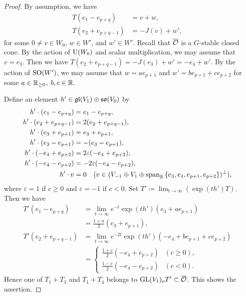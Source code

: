 \begin{proof}
	By assumption, we have
	\begin{align*}
		T(e_1 - e_{p+q}) &= v + w, \\
		T(e_2 + e_{p+q-1}) &= -J(v) + w',
	\end{align*}
	for some $0\neq v \in W_0$, $w \in W'$, and $w' \in W'$.
	Recall that $\overline{\mathcal{O}}$ is a $G$-stable closed cone.
	By the action of $\mathrm{U}(W_0)$ and scalar multiplication, we may assume that $v = e_3$.
	Then we have $T(e_2 + e_{p+q-1}) = -J(e_3) + w' = -e_4 + w'$.
	By the action of $\mathrm{SO}(W')$, we may assume that $w = ae_{p+1}$ and $w' = be_{p+1} + ce_{p+2}$ for some $a \in \mathbb{R}_{\geq 0}$, $b, c \in \mathbb{R}$.
	
	Define an element $h' \in \mathfrak{gl}(V_1) \oplus \mathfrak{so}(V_0)$ by
	\begin{align*}
		h' \cdot (e_1 - e_{p+q}) &= e_1 - e_{p+q}, \\
		h'\cdot (e_2 + e_{p+q-1}) &= 2(e_2 + e_{p+q-1}), \\
		h'\cdot (e_3 + e_{p+1}) &= e_3 + e_{p+1}, \\
		h'\cdot (e_3 - e_{p+1}) &= -(e_3 - e_{p+1}), \\
		h'\cdot (-e_4 + e_{p+2}) &= 2\varepsilon (-e_4 + e_{p+2}), \\
		h'\cdot (-e_4 - e_{p+2}) &= -2\varepsilon(-e_4 - e_{p+2}), \\
		h'\cdot v &= 0 \quad (v \in (V_{-1} \oplus V_1 \oplus \mathrm{span}_{\mathbb{R}}\left\{e_3, e_4, e_{p+1}, e_{p+2}\right\})^\perp),
	\end{align*}
	where $\varepsilon = 1$ if $c \geq 0$ and $\varepsilon = -1$ if $c < 0$.
	Set $T'\coloneq \lim_{t\to \infty} (\exp(th')T)$.
	Then we have
	\begin{align*}
		T'(e_1 - e_{p+q}) &= \lim_{t\to \infty} e^{-t}\exp(th')(e_3 + ae_{p+1})\\ 
		&= \frac{1+a}{2}(e_3 + e_{p+1}), \\
		T'(e_2 + e_{p+q-1}) &= \lim_{t\to \infty} e^{-2t}\exp(th')(-e_4 + be_{p+1} + ce_{p+2}) \\
		&= \begin{cases}
			\frac{1+c}{2}(-e_4 + e_{p+2}) & (c \geq 0), \\
			\frac{1-c}{2}(-e_4 - e_{p+2}) & (c < 0).
		\end{cases}
	\end{align*}
	Hence one of $T_1 + T_3$ and $T_1 + T_4$ belongs to $\mathrm{GL}(V_1)_o T' \subset \overline{\mathcal{O}}$.
	This shows the assertion.
\end{proof}

